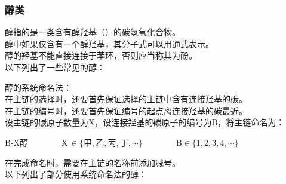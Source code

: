 \documentclass[UTF8]{ctexart}
\begin{document}
\subsubsection{醇类}
    醇指的是一类含有醇羟基（）的碳氢氧化合物。\\[3mm]
    醇中如果仅含有一个醇羟基，其分子式可以用通式表示。\\[3mm]
    醇的羟基不能直接连接于苯环，否则应当称其为酚。\\[3mm]
    以下列出了一些常见的醇：\vspace{8pt}
    \begin{center}
        \qquad\quad
        \qquad\quad
    \end{center}\vspace{20pt}
    醇的系统命名法：\\[3mm]
    在主链的选择时，还要首先保证选择的主链中含有连接羟基的碳。\\[3mm]
    在主链的编号时，还要首先保证编号的起点离连接羟基的碳最近。\\[3mm]
    设主链的碳原子数量为X，设连接羟基的碳原子的编号为B，将主链命名为：
    \begin{center}
        B-X醇~~~~~~~~X\,$\in\big\{\text{甲},\text{乙},\text{丙},\text{丁},\cdots\big\}$~~~~~~~~$\text{B}\in\big\{1,2,3,4,\cdots\big\}$\\[5mm]
    \end{center}
    在完成命名时，需要在主链的名称前添加减号。\\[5mm]
    以下列出了部分使用系统命名法的醇：\vspace{8pt}
    \begin{center}
        \qquad\qquad
    \end{center}\vspace{5pt}
\end{document}
